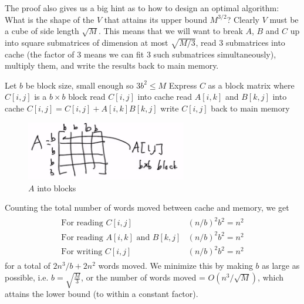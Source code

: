 \documentclass[11pt]{article}
\numberwithin{equation}{section}
\begin{document}
The proof also gives us a big hint as to how to design an optimal algorithm: What is the shape of the $V$ that attains its upper bound $M^{3/2}$? 
Clearly $V$ must be a cube of side length $\sqrt{M}$. This means that we will want to break $A$, $B$ and $C$ up into square submatrices of dimension at most $\sqrt{M/3}$, 
read 3 submatrices into cache (the factor of 3 means we can fit 3 such submatrices simultaneously), multiply them, and write the results back to main memory.

\begin{algorithmfrm}
    \begin{algorithmic}[1]
        \State Let $b$ be block size, small enough so $3b^2\leq M$
        \State Express $C$ as a block matrix where $C[i,j]$ is a $b \times b$ block 
                \State read $C[i,j]$ into cache 
                    \State read $A[i,k]$ and $B[k,j]$ into cache 
                    \State $C[i,j] = C[i,j] + A[i,k]B[k,j]$ 
                \EndFor
                \State write $C[i,j]$ back to main memory 
            \EndFor
        \EndFor
    \end{algorithmic}
\end{algorithmfrm}

\begin{figure}[h]
    \centering
    \includegraphics[width=7cm]{images/lec4-7.png}
    \caption{$A$ into blocks}
\end{figure}

Counting the total number of words moved between cache and memory, we get \begin{align*}
    \begin{array}{ll}
        \text{For reading } C[i,j] & (n/b)^2 b^2 = n^2 \\
        \text{For reading } A[i,k] \text{ and } B[k,j] & (n/b)^2 b^2 = n^2 \\
        \text{For writing } C[i,j] & (n/b)^2 b^2 = n^2
    \end{array}
\end{align*}
for a total of $2 n^3/b + 2n^2$ words moved. We minimize this by making $b$ as large as possible, i.e. $b = \sqrt{\frac{M}{3}}$, 
or the number of words moved = $O(n^3/\sqrt{M})$, which attains the lower bound (to within a constant factor).
\end{document}

